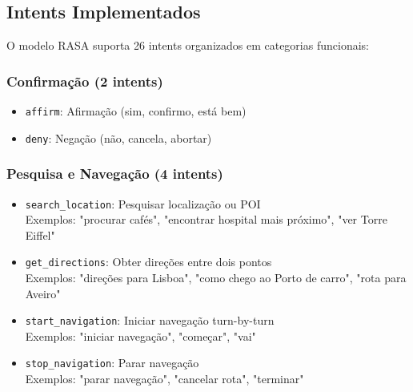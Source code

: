\subsection{Intents Implementados}

O modelo RASA suporta 26 intents organizados em categorias funcionais:

\subsubsection{Confirmação (2 intents)}
\begin{itemize}
    \item \texttt{affirm}: Afirmação (sim, confirmo, está bem)
    \item \texttt{deny}: Negação (não, cancela, abortar)
\end{itemize}

\subsubsection{Pesquisa e Navegação (4 intents)}
\begin{itemize}
    \item \texttt{search\_location}: Pesquisar localização ou POI \\
    Exemplos: "procurar cafés", "encontrar hospital mais próximo", "ver Torre Eiffel"

    \item \texttt{get\_directions}: Obter direções entre dois pontos \\
    Exemplos: "direções para Lisboa", "como chego ao Porto de carro", "rota para Aveiro"

    \item \texttt{start\_navigation}: Iniciar navegação turn-by-turn \\
    Exemplos: "iniciar navegação", "começar", "vai"

    \item \texttt{stop\_navigation}: Parar navegação \\
    Exemplos: "parar navegação", "cancelar rota", "terminar"
\end{itemize}

